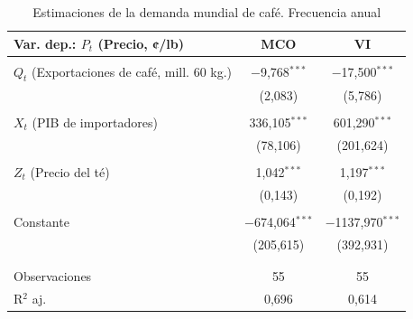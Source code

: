 \scriptsize
\begin{table}[H] \centering 
\caption{Estimaciones de la demanda mundial de café. Frecuencia anual} 
\label{tab:est_demand_y}
\begin{tabular}{@{\extracolsep{5pt}}lcc} 
\hline 
\hline 
Var. dep.: $P_{t}$ (Precio, ¢/lb) & MCO & VI \\ 
\hline 
\\[-1.8ex] 
$Q_{t}$ (Exportaciones de café, mill. 60 kg.)  & $-$9,768$^{***}$ & $-$17,500$^{***}$ \\ 
  & (2,083) & (5,786) \\ 
  & & \\ 
$X_{t}$ (PIB de importadores) & 336,105$^{***}$ & 601,290$^{***}$ \\ 
  & (78,106) & (201,624) \\ 
  & & \\ 
$Z_{t}$ (Precio del té) & 1,042$^{***}$& 1,197$^{***}$ \\ 
  & (0,143) & (0,192) \\ 
  & &\\ 
Constante & $-$674,064$^{***}$ & $-$1137,970$^{***}$ \\ 
  & (205,615) & (392,931) \\ 
  & & \\ 
\hline \\[-1.8ex] 
Observaciones & 55 & 55 \\ 
R$^{2}$ aj. & 0,696 & 0,614 \\
\hline 
\hline
\end{tabular}
\end{table}